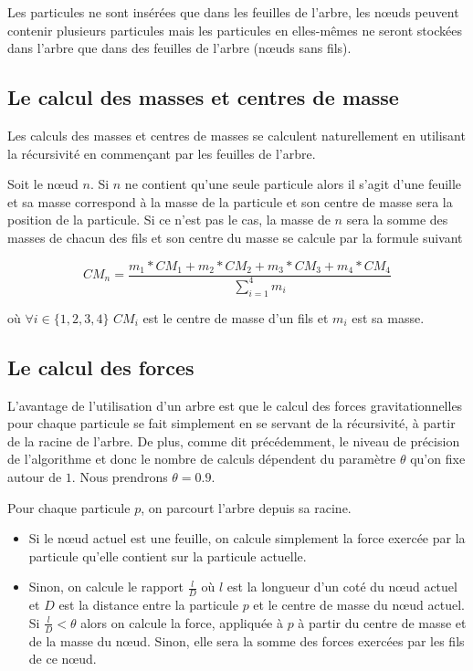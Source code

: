 Les particules ne sont insérées que dans les feuilles de l'arbre, les nœuds peuvent contenir plusieurs particules mais les particules en elles-mêmes ne seront stockées dans l'arbre que dans des feuilles de l'arbre (nœuds sans fils).

\subsection{Le calcul des masses et centres de masse}

Les calculs des masses et centres de masses se calculent naturellement en utilisant la récursivité en commençant par les feuilles de l'arbre.

Soit le nœud $n$. 
Si $n$ ne contient qu'une seule particule alors il s'agit d'une feuille et sa masse correspond à la masse de la particule et son centre de masse sera la position de la particule. Si ce n'est pas le cas, la masse de $n$ sera la somme des masses de chacun des fils et son centre du masse se calcule par la formule suivant

\begin{equation}
    CM_n = \frac{m_1*CM_1 + m_2*CM_2+ m_3*CM_3 + m_4*CM_4 }{\sum_{i=1}^{4}{m_i}}
\end{equation}

où $\forall i\in \{1,2,3,4\}$ $CM_i$ est le centre de masse d'un fils et $m_i$ est sa masse.

\subsection{Le calcul des forces}

L'avantage de l'utilisation d'un arbre est que le calcul des forces gravitationnelles pour chaque particule se fait simplement en se servant de la récursivité, à partir de la racine de l'arbre. De plus, comme dit précédemment, le niveau de précision de l'algorithme et donc le nombre de calculs dépendent du paramètre $\theta$ qu'on fixe autour de $1$. Nous prendrons $\theta = 0.9$.

Pour chaque particule $p$, on parcourt l'arbre depuis sa racine.

\begin{itemize}
\item Si le nœud actuel est une feuille, on calcule simplement la force exercée par la particule qu'elle contient sur la particule actuelle.

\item Sinon, on calcule le rapport $\frac{l}{D}$ où $l$ est la
longueur d'un coté du nœud actuel  et $D$ est la distance entre la particule $p$ et le centre de masse du nœud actuel.
Si $\frac{l}{D} < \theta$ alors on calcule la force, appliquée à $p$ à partir du centre de masse et de la masse du nœud. Sinon, elle sera la somme des forces exercées par les fils de ce nœud.
\end{itemize}


